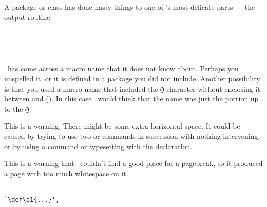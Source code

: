 \begin{plainlist}
     A package or class has done nasty things to one of \ltx's most
     delicate parts --- the output routine.

\item[\textmess{!}] 
      \\

\item[\textmess{!}] 
     \\

    \tx\ has come across a macro name that it does not know about.
Perhaps you mispelled it, or it is defined in a package you did not include.
Another possibility is that you used a macro name that included the
\texttt{@} character without enclosing it between \cmd{\makeatletter}
and \cmd{\makeother} (\seeatincode)\idxatincode. 
In this case \tx\ would think that the name was 
just the portion up to the \texttt{@}.


\item[\textmess{!}] 

    This is a warning. There might be some extra horizontal space. It could
be caused by trying to use two \cmd{\newline} or \cmd{\\} commands
in succession with nothing intervening, or by using a \cmd{\linebreak}
command or typesetting with the \cmd{\sloppy} declaration.

\item[\textmess{!}]  

    This is a warning that \tx\ couldn't find a good place for a
pagebreak, so it produced a page with too much whitespace on it.

\item[\textmess{!}]
     \\
     \verb?`\def\a1{...}',?



\end{plainlist}
